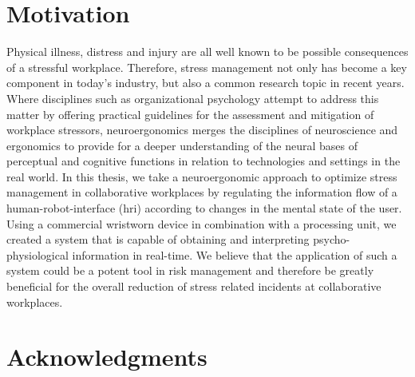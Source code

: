 

\section{Motivation}
Physical illness, distress and injury are all well known to be possible consequences of a stressful workplace. 
Therefore, stress management not only has become a key component in today's industry, but also a common research topic in recent years. Where disciplines such as organizational psychology attempt to address this matter by offering practical guidelines for the assessment and mitigation of workplace stressors, neuroergonomics merges the disciplines of neuroscience and ergonomics to provide for a deeper understanding of the neural bases of perceptual and cognitive functions in relation to technologies and settings in the real world. 
In this thesis, we take a neuroergonomic approach to optimize stress management in collaborative workplaces by regulating the information flow of a human-robot-interface (\gls{hri}) according to changes in the mental state of the user. 
Using a commercial wristworn device in combination with a processing unit, we created a system that is capable of obtaining and interpreting psycho-physiological information in real-time.
We believe that the application of such a system could be a potent tool in risk management and therefore be greatly beneficial for the overall reduction of stress related incidents at collaborative workplaces.


\section{Acknowledgments}


